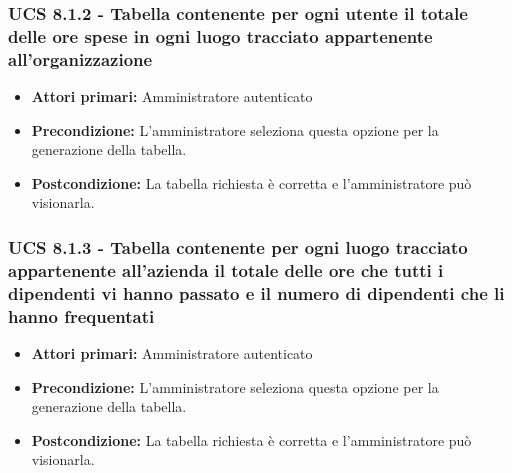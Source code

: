\subsubsection{UCS 8.1.2 - Tabella contenente per ogni utente il totale delle ore spese in ogni luogo tracciato appartenente all'organizzazione}%
\begin{itemize}
\item \textbf{Attori primari:} Amministratore autenticato
\item \textbf{Precondizione:} L'amministratore seleziona questa opzione per la generazione della tabella.
\item \textbf{Postcondizione:} La tabella richiesta è corretta e l'amministratore può visionarla.
\end{itemize}

\subsubsection{UCS 8.1.3 - Tabella contenente per ogni luogo tracciato appartenente all'azienda il totale delle ore che tutti i dipendenti vi hanno passato e il numero di dipendenti che li hanno frequentati}%
\begin{itemize}
\item \textbf{Attori primari:} Amministratore autenticato
\item \textbf{Precondizione:} L'amministratore seleziona questa opzione per la generazione della tabella.
\item \textbf{Postcondizione:} La tabella richiesta è corretta e l'amministratore può visionarla.
\end{itemize}

